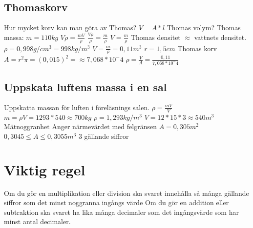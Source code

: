 \documentclass[a4paper,11pt]{article}
\begin{document}
\begin{flushleft}
\subsection{Thomaskorv}
Hur mycket korv kan man göra av Thomas?\newline
$ V = A*l $\newline
Thomas volym?\newline
Thomas massa: $ m=110kg $\newline
$ V \rho = \frac{mV}{\rho} $\newline
$ \frac{V\rho}{\rho} = \frac{m}{\rho} $\newline
$ V = \frac{m}{\rho} $ \newline
Thomas densitet $ \approx $ vattnets densitet.\newline
$ \rho = 0,998 g/cm^3 = 998 kg/m^3 $\newline
$ V= \frac{m}{\rho} = 0,11 m^3 $\newline
$ r = 1,5 cm $ Thomas korv\newline
$ A = r^2 \pi = (0,015)^2 =\approx 7,068*10^-4 $\newline
$ \rho = \frac{V}{A} = \frac{0,11}{7,068*10^-4} $\newline
\newline
\subsection{Uppskata luftens massa i en sal}
Uppskatta massan för luften i föreläsnings salen.\newline
$ \rho = \frac{m V}{V} $\newline
$ m = \rho V = 1293 * 540 \approx 700 kg $\newline
$ \rho = 1,293 kg/m^3 $\newline
$ V = 12 * 15 * 3  \approx 540 m^3 $
Mätnoggranhet\newline
Anger närmevärdet med felgränsen\newline
$ A = 0,305 m^2 $\newline
$ 0,3045 \leqslant  A \leqslant  0,3055 m^3 $ 3 gällande siffror\newline
\newpage
\section{Viktig regel}
Om du gör en multiplikation eller division ska svaret innehålla så många gällande siffror som det minst noggranna ingångs värde\newline\newline
Om du gör en addition eller subtraktion ska svaret ha lika många decimaler som det ingångsvärde som har minst antal decimaler.
\newline

\end{flushleft}
\end{document}
